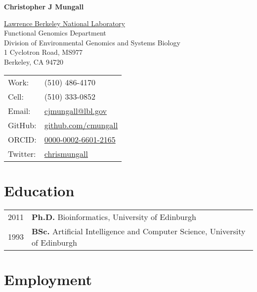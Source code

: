 \documentclass[11pt,fullpage]{article}
\def\name{Christopher J Mungall}
\begin{document}


\centerline{\Large \bf \name}

\vspace{0.25in}

\begin{minipage}{0.60\linewidth}
  \href{http://www.lbl.gov/}{Lawrence Berkeley National Laboratory} \\
  Functional Genomics Department \\
  Division of Environmental Genomics and Systems Biology \\
  1 Cyclotron Road, MS977 \\
  Berkeley, CA 94720
\end{minipage}
\begin{minipage}{0.40\linewidth}
  \begin{tabular}{ll}
    Work: & (510) 486-4170 \\
    Cell: & (510) 333-0852 \\
    Email: & \href{mailto:cjmungall@lbl.gov}{cjmungall@lbl.gov} \\
    GitHub: & \href{http://github.com/cmungall}{github.com/cmungall} \\
    ORCID: & \href{http://orcid.org/0000-0002-6601-2165}{0000-0002-6601-2165} \\
    Twitter: & \href{http://twitter.com/cmungall}{chrismungall} \\
  \end{tabular}
\end{minipage}

\hrulefill

\section*{Education}

\begin{tabular}{ll}
	2011 & {\bf Ph.D.} Bioinformatics, University of Edinburgh \\
	1993 & {\bf BSc.} Artificial Intelligence and Computer
        Science, University of Edinburgh \\
\end{tabular}

\section*{Employment}
\end{document}
